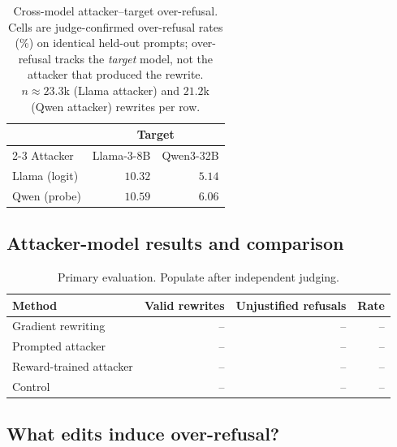 \documentclass{article}
\begin{document}
 
\begin{table}[t]
  \centering
  \caption{Cross-model attacker--target over-refusal. Cells are judge-confirmed over-refusal rates (\%) on identical held-out prompts; over-refusal tracks the \emph{target} model, not the attacker that produced the rewrite. $n\!\approx\!23.3$k (Llama attacker) and $21.2$k (Qwen attacker) rewrites per row.}
  \label{tab:cross_model}
  \begin{tabular}{lrr}
    \toprule
     & \multicolumn{2}{c}{Target} \\
    \cmidrule(lr){2-3}
    Attacker & Llama-3-8B & Qwen3-32B \\
    \midrule
    Llama (logit) & $10.32$ & $5.14$ \\
    Qwen (probe)  & $10.59$ & $6.06$ \\
    \bottomrule
  \end{tabular}
\end{table}
 
\subsection{Attacker-model results and comparison}

\begin{table}[t]
  \centering
  \caption{Primary evaluation. Populate after independent judging.}
  \label{tab:primary}
  \begin{tabular}{lrrr}
    \toprule
    Method & Valid rewrites & Unjustified refusals & Rate \\
    \midrule
    Gradient rewriting & -- & -- & -- \\
    Prompted attacker & -- & -- & -- \\
    Reward-trained attacker & -- & -- & -- \\
    Control & -- & -- & -- \\
    \bottomrule
  \end{tabular}
\end{table}

\subsection{What edits induce over-refusal?}
\end{document}
